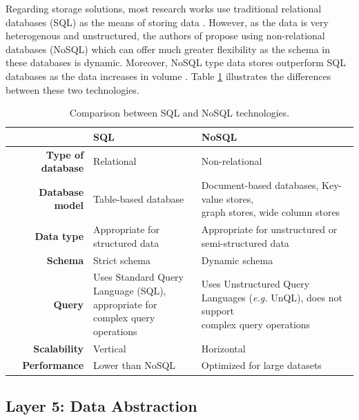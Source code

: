 Regarding storage solutions, most research works use traditional relational databases (SQL) as the means of storing data \cite{Fuhrer2006, Wu2020, Catarinucci2015, Adame2018}. However, as the data is very heterogenous and unstructured, the authors of \cite{Subahi2019} propose using non-relational databases (NoSQL) which can offer much greater flexibility as the schema in these databases is dynamic. Moreover, NoSQL type data stores outperform SQL databases as the data increases in volume \cite{Xu2014}. Table \ref{tab:comparsion-databasetech} illustrates the differences between these two technologies. 

\renewcommand{\arraystretch}{2}
\begin{table}[H]
    \centering
    \begin{tabular}{r|l|l}
        & \textbf{SQL}& \textbf{NoSQL}  \\ \hline
        \textbf{Type of database} & Relational & Non-relational \\
        \textbf{Database model} & Table-based database & \makecell{Document-based databases, Key-value stores, \\ graph stores, wide column stores} \\
        \textbf{Data type} & Appropriate for structured data & Appropriate for unstructured or semi-structured data \\
        \textbf{Schema} & Strict schema & Dynamic schema \\
        \textbf{Query} & \makecell{Uses Standard Query \\Language (SQL), appropriate for \\ complex query operations} & \makecell{Uses Unstructured Query \\ Languages (\textit{e.g.} UnQL), does not support \\ complex query operations}  \\ 
        \textbf{Scalability} & Vertical & Horizontal \\
        \textbf{Performance} & Lower than NoSQL & Optimized for large datasets \\
    \end{tabular}
    \caption{Comparison between SQL and NoSQL technologies.}
    \label{tab:comparsion-databasetech}
\end{table} 
\renewcommand{\arraystretch}{1}

\subsection{Layer 5: Data Abstraction}
\label{sec:iot-model-layer5}

